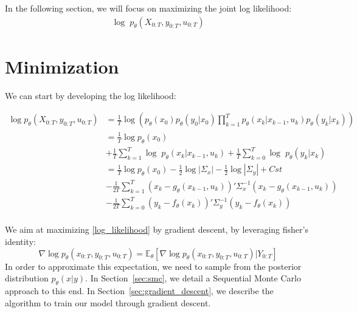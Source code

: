 \documentclass[10pt,a4paper]{article}
\begin{document}
In the following section, we will focus on maximizing the joint log likelihood:
\begin{align}
        \log \; p_{\theta}(X_{0:T}, y_{0:T}, u_{0:T})
        \label{log_likelihood}
\end{align}

\section{Minimization}
We can start by developing the log likelihood:

\begin{align*}
        \log p_{\theta}(X_{0:T}, y_{0:T}, u_{0:T}) & = \frac{1}{T} \log\left(p_\theta(x_0)p_\theta(y_0 | x_0)\prod_{k=1}^{T} p_{\theta}(x_k | x_{k-1}, u_k) p_{\theta}(y_k | x_k)\right) \\
                                                   & = \frac{1}{T} \log p_\theta(x_0)                                                                                                    \\
                                                   & + \frac{1}{T} \sum_{k=1}^{T} \log \; p_{\theta}(x_k | x_{k-1}, u_k) + \frac{1}{T} \sum_{k=0}^{T} \log \; p_{\theta}(y_k | x_k)      \\
                                                   & = \frac{1}{T} \log p_\theta(x_0) -\frac{1}{2} \log|\Sigma_x| -\frac{1}{2} \log|\Sigma_y| + Cst                                      \\
                                                   & - \frac{1}{2T} \sum_{k=1}^{T}(x_k - g_\theta(x_{k-1}, u_{k}))' \Sigma_x^{-1} (x_k - g_\theta(x_{k-1}, u_{k}))                       \\
                                                   & - \frac{1}{2T} \sum_{k=0}^{T}(y_k - f_\theta(x_k))' \Sigma_y^{-1} (y_k - f_\theta(x_k))                                             \\
\end{align*}

We aim at maximizing \ref{log_likelihood} by gradient descent, by leveraging fisher's identity:
$$
        \nabla \log p_\theta(x_{0:T}, y_{0:T}, u_{0:T}) = \mathbb{E}_\theta \left[ \nabla\log p_\theta(x_{0:T}, y_{0:T}, u_{0:T}) | Y_{0:T} \right]
$$
In order to approximate this expectation, we need to sample from the posterior distribution $p_\theta(x|y)$.
In Section~\ref{sec:smc}, we detail a Sequential Monte Carlo approach to this end.
In Section~\ref{sec:gradient_descent}, we describe the algorithm to train our model through gradient descent.
\end{document}
